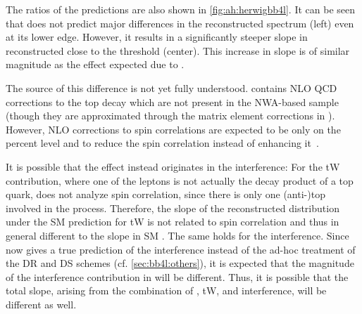 The ratios of the predictions are also shown in \cref{fig:ah:herwigbb4l}. It can be seen that \bbfourl does not predict major differences in the reconstructed \mtt spectrum (left) even at its lower edge. However, it results in a significantly steeper slope in reconstructed \chel close to the threshold (center). This increase in slope is of similar magnitude as the effect expected due to \etat. 

The source of this difference is not yet fully understood. \bbfourl contains NLO QCD corrections to the top decay which are not present in the NWA-based \ttbar sample (though they are approximated through the matrix element corrections in \pythia). However, NLO corrections to spin correlations are expected to be only on the percent level and to reduce the spin correlation instead of enhancing it~\cite{Bernreuther:2004jv}. 

It is possible that the effect instead originates in the \tttW interference:
For the tW contribution, where one of the leptons is not actually the decay product of a top quark,
\chel does not analyze spin correlation, since there is only one (anti-)top involved in the process. 
Therefore, the slope of the reconstructed \chel distribution under the SM prediction for tW is not related to \ttbar spin correlation and thus in general different to the slope in SM \ttbar. The same holds for the \tttW interference. Since \bbfourl now gives a true prediction of the \tttW interference instead of the ad-hoc treatment of the DR and DS schemes (cf. \cref{sec:bb4l:others}), it is expected that the magnitude of the interference contribution in \bbfourl will be different. Thus, it is possible that the total \chel slope, arising from the combination of \ttbar, tW, and \tttW interference, will be different as well.


